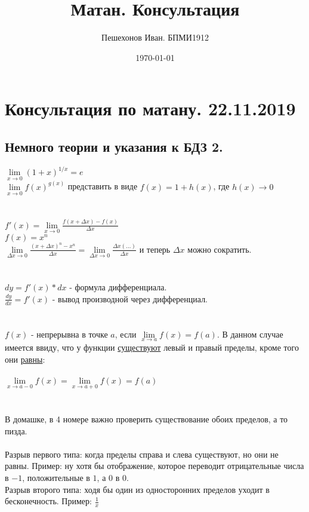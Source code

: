 \documentclass[a4paper,11pt]{report}
\title{Матан. Консультация}
\author{Пешехонов Иван. БПМИ1912}
\date{\today}
\begin{document}
\chapter{Консультация по матану. 22.11.2019}
\section{Немного теории и указания к БДЗ 2.}
$\lim\limits_{x\to0} (1+x)^{1/x} = e$\\
$\lim\limits _{x\to0}f(x)^{g(x)}$ представить в виде $ f(x) = 1 + h(x)$, где $h(x)\to0$\\
\\
\\
$f'(x) = \lim\limits_{x\to0}{\frac{f(x + \Delta{x}) - f(x)}{\Delta{x}}}$\\
$f(x) = x^n$\\
$\lim\limits_{\Delta{x}\to0}\frac{(x + \Delta{x})^n - x^n}{\Delta{x}} = \lim\limits_{\Delta{x}\to0}\frac{\Delta{x}(...)}{\Delta{x}}$ и теперь $\Delta{x}$ можно сократить.\\
\\
\\
$dy = f'(x)*dx$ - формула дифференциала.\\
$\frac{dy}{dx} = f'(x)$ - вывод производной через дифференциал.\\
\\
\\
$f(x)$ - непрерывна в точке $a$, если $\lim\limits_{x\to{a}}f(x) = f(a)$. В данном случае имеется ввиду,
что у функции \underline{существуют} левый и правый пределы, кроме того
они \underline{равны}:\\
\\
$\lim\limits_{x\to{a-0}}{f(x)} = \lim\limits_{x\to{a+0}}{f(x)}=f(a)$\\
\\
\\
В домашке, в 4 номере важно проверить существование обоих пределов, а то пизда.\\
\\

Разрыв первого типа: когда пределы справа и слева существуют, но они не равны. 
Пример: ну хотя бы отображение, которое переводит отрицательные числа в $-1$, 
положительные в $1$, а $0$ в $0$.\\

Разрыв второго типа: ходя бы один из односторонних пределов уходит в бесконечность.
Пример: $\frac{1}{x}$\\
\end{document}
